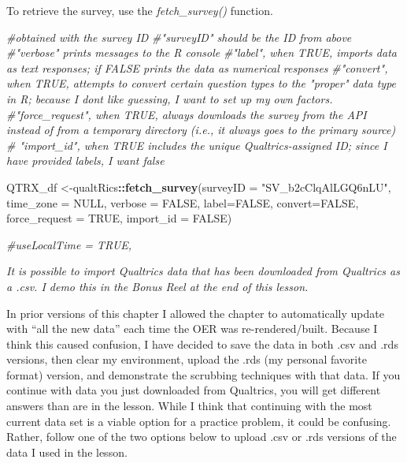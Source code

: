 \documentclass[
  11pt,
]{book}
\newenvironment{Shaded}{\begin{snugshade}}{\end{snugshade}}
\newcommand{\AttributeTok}[1]{\textcolor[rgb]{0.27,0.27,0.27}{#1}}
\newcommand{\CommentTok}[1]{\textcolor[rgb]{0.37,0.37,0.37}{\textit{#1}}}
\newcommand{\ConstantTok}[1]{\textcolor[rgb]{0.37,0.37,0.37}{#1}}
\newcommand{\FunctionTok}[1]{\textcolor[rgb]{0.27,0.27,0.27}{\textbf{#1}}}
\newcommand{\NormalTok}[1]{#1}
\newcommand{\OtherTok}[1]{\textcolor[rgb]{0.37,0.37,0.37}{#1}}
\newcommand{\SpecialCharTok}[1]{\textcolor[rgb]{0.43,0.43,0.43}{\textbf{#1}}}
\newcommand{\StringTok}[1]{\textcolor[rgb]{0.5,0.5,0.5}{#1}}
\begin{document}
To retrieve the survey, use the \emph{fetch\_survey()} function.

\begin{Shaded}
\begin{Highlighting}[]
\CommentTok{\#obtained with the survey ID }
\CommentTok{\#"surveyID" should be the ID from above}
\CommentTok{\#"verbose" prints messages to the R console}
\CommentTok{\#"label", when TRUE, imports data as text responses; if FALSE prints the data as numerical responses}
\CommentTok{\#"convert", when TRUE, attempts to convert certain question types to the "proper" data type in R; because I don\textquotesingle{}t like guessing, I want to set up my own factors.}
\CommentTok{\#"force\_request", when TRUE, always downloads the survey from the API instead of from a temporary directory (i.e., it always goes to the primary source)}
\CommentTok{\# "import\_id", when TRUE includes the unique Qualtrics{-}assigned ID; since I have provided labels, I want false}

\NormalTok{QTRX\_df }\OtherTok{\textless{}{-}}\NormalTok{qualtRics}\SpecialCharTok{::}\FunctionTok{fetch\_survey}\NormalTok{(}\AttributeTok{surveyID =} \StringTok{"SV\_b2cClqAlLGQ6nLU"}\NormalTok{, }\AttributeTok{time\_zone =} \ConstantTok{NULL}\NormalTok{, }\AttributeTok{verbose =} \ConstantTok{FALSE}\NormalTok{, }\AttributeTok{label=}\ConstantTok{FALSE}\NormalTok{, }\AttributeTok{convert=}\ConstantTok{FALSE}\NormalTok{, }\AttributeTok{force\_request =} \ConstantTok{TRUE}\NormalTok{, }\AttributeTok{import\_id =} \ConstantTok{FALSE}\NormalTok{)}

\CommentTok{\#useLocalTime = TRUE,}
\end{Highlighting}
\end{Shaded}

\emph{It is possible to import Qualtrics data that has been downloaded from Qualtrics as a .csv. I demo this in the Bonus Reel at the end of this lesson.}

In prior versions of this chapter I allowed the chapter to automatically update with ``all the new data'' each time the OER was re-rendered/built. Because I think this caused confusion, I have decided to save the data in both .csv and .rds versions, then clear my environment, upload the .rds (my personal favorite format) version, and demonstrate the scrubbing techniques with that data. If you continue with data you just downloaded from Qualtrics, you will get different answers than are in the lesson. While I think that continuing with the most current data set is a viable option for a practice problem, it could be confusing. Rather, follow one of the two options below to upload .csv or .rds versions of the data I used in the lesson.
\end{document}
